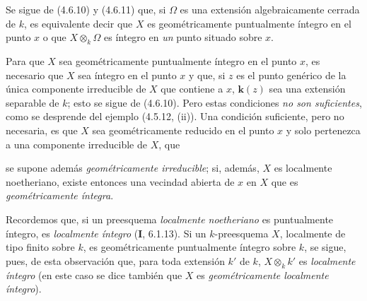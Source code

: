 \begin{env}[4.6.14]
\label{IV.2.4.6.14-fr}
Se sigue de (4.6.10) y (4.6.11) que, si $\Omega$ es una extensión
algebraicamente cerrada de $k$, es equivalente decir que $X$ es
geométricamente puntualmente íntegro en el punto $x$ o que
$X\otimes_k\Omega$ es íntegro en \emph{un} punto situado sobre $x$.

Para que $X$ sea geométricamente puntualmente íntegro en el punto $x$, es
necesario que $X$ sea íntegro en el punto $x$ y que, si $z$ es el punto
genérico de la única componente irreducible de $X$ que contiene a $x$, $\boldsymbol{k}(z)$
sea una extensión separable de $k$; esto se sigue de (4.6.10). Pero estas
condiciones \emph{no son suficientes}, como se desprende del ejemplo (4.5.12,
(ii)). Una condición suficiente, pero no necesaria, es que $X$ sea
geométricamente reducido en el punto $x$ y solo pertenezca a una componente
irreducible de $X$, que


se supone además \emph{geométricamente irreducible}; si, además, $X$ es
localmente noetheriano, existe entonces una vecindad abierta de $x$ en $X$ que
es \emph{geométricamente íntegra}.
\end{env}

Recordemos que, si un preesquema \emph{localmente noetheriano} es puntualmente
íntegro, es \emph{localmente íntegro} (\textbf I, 6.1.13). Si un $k$-preesquema $X$,
localmente de tipo finito sobre $k$, es geométricamente puntualmente íntegro
sobre $k$, se sigue, pues, de esta observación que, para toda extensión $k'$
de $k$, $X\otimes_k k'$ es \emph{localmente íntegro} (en este caso se dice
también que $X$ es \emph{geométricamente localmente íntegro}).

